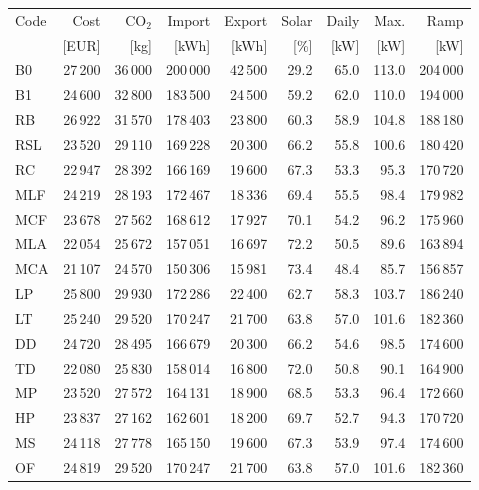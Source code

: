 \clearpage
\noindent\begin{minipage}{\textwidth}\singlespacing\captionsetup{font=footnotesize}
\setlength{\tabcolsep}{4pt}
\renewcommand{\arraystretch}{1.0}
\label{tab:full-scorecard-3-0}
\fontsize{8}{9}\selectfont
\begin{tabular*}{\textwidth}{@{\extracolsep{\fill}}lrrrrrrrr@{}}
\toprule
Code & Cost & CO$_2$ & Import & Export & Solar & Daily & Max. & Ramp\\
 & [EUR] & [kg] & [kWh] & [kWh] & [\%] & [kW] & [kW] & [kW]\\
\midrule
B0 & 27\,200 & 36\,000 & 200\,000 & 42\,500 & 29.2 & 65.0 & 113.0 & 204\,000\\
B1 & 24\,600 & 32\,800 & 183\,500 & 24\,500 & 59.2 & 62.0 & 110.0 & 194\,000\\
RB & 26\,922 & 31\,570 & 178\,403 & 23\,800 & 60.3 & 58.9 & 104.8 & 188\,180\\
RSL & 23\,520 & 29\,110 & 169\,228 & 20\,300 & 66.2 & 55.8 & 100.6 & 180\,420\\
RC & 22\,947 & 28\,392 & 166\,169 & 19\,600 & 67.3 & 53.3 & 95.3 & 170\,720\\
MLF & 24\,219 & 28\,193 & 172\,467 & 18\,336 & 69.4 & 55.5 & 98.4 & 179\,982\\
MCF & 23\,678 & 27\,562 & 168\,612 & 17\,927 & 70.1 & 54.2 & 96.2 & 175\,960\\
MLA & 22\,054 & 25\,672 & 157\,051 & 16\,697 & 72.2 & 50.5 & 89.6 & 163\,894\\
MCA & 21\,107 & 24\,570 & 150\,306 & 15\,981 & 73.4 & 48.4 & 85.7 & 156\,857\\
LP & 25\,800 & 29\,930 & 172\,286 & 22\,400 & 62.7 & 58.3 & 103.7 & 186\,240\\
LT & 25\,240 & 29\,520 & 170\,247 & 21\,700 & 63.8 & 57.0 & 101.6 & 182\,360\\
DD & 24\,720 & 28\,495 & 166\,679 & 20\,300 & 66.2 & 54.6 & 98.5 & 174\,600\\
TD & 22\,080 & 25\,830 & 158\,014 & 16\,800 & 72.0 & 50.8 & 90.1 & 164\,900\\
MP & 23\,520 & 27\,572 & 164\,131 & 18\,900 & 68.5 & 53.3 & 96.4 & 172\,660\\
HP & 23\,837 & 27\,162 & 162\,601 & 18\,200 & 69.7 & 52.7 & 94.3 & 170\,720\\
MS & 24\,118 & 27\,778 & 165\,150 & 19\,600 & 67.3 & 53.9 & 97.4 & 174\,600\\
OF & 24\,819 & 29\,520 & 170\,247 & 21\,700 & 63.8 & 57.0 & 101.6 & 182\,360\\

\end{tabular*}
\end{minipage}
